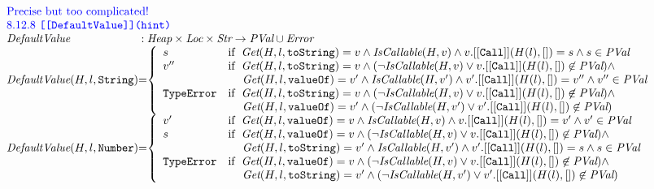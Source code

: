 \[\begin{array}{l@{}c@{}l}
\multicolumn{3}{l}{\mbox{\inblue Precise but too complicated!}}\\
\multicolumn{3}{l}{\mbox{\inblue 8.12.8 {\tt [[DefaultValue]](hint)}}}\\
\hf{DefaultValue} & :& \Heap \times \Loc \times \Str \rightarrow \pval \cup \Error \\
\hf{DefaultValue}(H,l,{\tt String}) &=&
\left\{\begin{array}{ll}
s   & \ifc{\hf{Get}(H,l,{\tt toString}) = v \wedge
\hf{IsCallable}(H,v) \wedge
v.{\tt[[Call]]}(H(l), []) = s \wedge
s\in\pval} \\
v'' & \ifc{\hf{Get}(H,l,{\tt toString}) = v \wedge
(\neg \hf{IsCallable}(H,v) \vee
v.{\tt[[Call]]}(H(l), []) \not\in\pval) \wedge} \\
& \mbox{\phantom{if \ }$
\hf{Get}(H,l,{\tt valueOf}) = v' \wedge
\hf{IsCallable}(H,v') \wedge
v'.{\tt[[Call]]}(H(l), []) = v'' \wedge
v''\in\pval$}\\
\te & \ifc{\hf{Get}(H,l,{\tt toString}) = v \wedge
(\neg \hf{IsCallable}(H,v) \vee
v.{\tt[[Call]]}(H(l), []) \not\in\pval) \wedge} \\
& \mbox{\phantom{if \ }$
\hf{Get}(H,l,{\tt valueOf}) = v' \wedge
(\neg \hf{IsCallable}(H,v') \vee
v'.{\tt[[Call]]}(H(l), []) \not\in\pval)$}
\end{array}\right.
\\[2em]

\hf{DefaultValue}(H,l,{\tt Number}) &=&
\left\{\begin{array}{ll}
v'   & \ifc{\hf{Get}(H,l,{\tt valueOf}) = v \wedge
\hf{IsCallable}(H,v) \wedge
v.{\tt[[Call]]}(H(l), []) = v' \wedge
v'\in\pval} \\
s & \ifc{\hf{Get}(H,l,{\tt valueOf}) = v \wedge
(\neg \hf{IsCallable}(H,v) \vee
v.{\tt[[Call]]}(H(l), []) \not\in\pval) \wedge} \\
& \mbox{\phantom{if \ }$
\hf{Get}(H,l,{\tt toString}) = v' \wedge
\hf{IsCallable}(H,v') \wedge
v'.{\tt[[Call]]}(H(l), []) = s \wedge
s\in\pval$}\\
\te & \ifc{\hf{Get}(H,l,{\tt valueOf}) = v \wedge
(\neg \hf{IsCallable}(H,v) \vee
v.{\tt[[Call]]}(H(l), []) \not\in\pval) \wedge} \\
& \mbox{\phantom{if \ }$
\hf{Get}(H,l,{\tt toString}) = v' \wedge
(\neg \hf{IsCallable}(H,v') \vee
v'.{\tt[[Call]]}(H(l), []) \not\in\pval)$}
\end{array}\right.
\end{array}
\]

